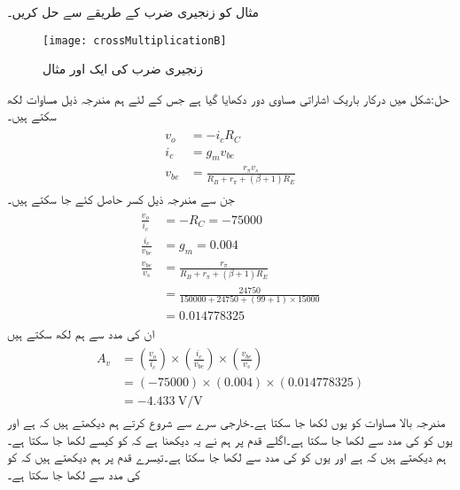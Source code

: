 مثال   کو زنجیری ضرب کے طریقے سے حل کریں۔
\begin{figure}
\centering
\texttt{[image: crossMultiplicationB]}
\caption{زنجیری ضرب کی ایک اور مثال}
\label{شکل_زنجیری_ضرب_ب}
\end{figure}
حل:شکل  میں درکار باریک اشاراتی مساوی دور دکھایا گیا ہے جس کے لئے ہم مندرجہ ذیل مساوات لکھ سکتے ہیں۔
\begin{gather}
\begin{aligned}
v_o&=-i_c R_C\\
i_c&=g_m v_{be}\\
v_{be}&=\frac{r_{\pi} v_s}{R_B +r_{\pi}+\left(\beta+1 \right )R_E}
\end{aligned}
\end{gather}
جن سے مندرجہ ذیل کسر حاصل کئے جا سکتے ہیں۔
\begin{gather}
\begin{aligned}
\frac{v_o}{i_c}&=-R_C=\num{-75000}\\
\frac{i_c}{v_{be}}&=g_m = \num{0.004}\\
\frac{v_{be}}{v_s}&=\frac{r_{\pi}}{R_B+r_{\pi}+\left(\beta+1 \right )R_E}\\
&=\frac{24750}{150000+24750+(99+1)\times 15000}\\
&=\num{0.014778325}
\end{aligned}
\end{gather}
ان کی مدد سے ہم لکھ سکتے ہیں
\begin{gather}
\begin{aligned}
A_v&=\left(\frac{v_o}{i_c} \right ) \times \left(\frac{i_c}{v_{be}} \right ) \times \left(\frac{v_{be}}{v_s} \right ) \\
&=(-75000) \times (0.004) \times (0.014778325)\\
&=\SI[per=frac,fraction=nice]{-4.433}{\volt \per \volt}
\end{aligned}
\end{gather}
مندرجہ بالا مساوات کو یوں لکھا جا سکتا ہے۔خارجی سرے سے شروع کرتے ہم دیکھتے ہیں کہ  ہے اور یوں  کو  کی مدد سے لکھا جا سکتا ہے۔اگلے قدم پر ہم نے یہ دیکھنا ہے کہ   کو کیسے لکھا جا سکتا ہے۔ہم دیکھتے ہیں کہ  ہے اور یوں  کو   کی مدد سے لکھا جا سکتا ہے۔تیسرے قدم پر ہم دیکھتے ہیں کہ   کو  کی مدد سے لکھا جا سکتا ہے۔



